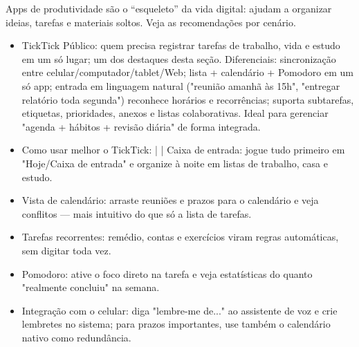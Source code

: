 


Apps de produtividade são o “esqueleto” da vida digital: ajudam a organizar ideias, tarefas e materiais soltos. Veja as recomendações por cenário.


\begin{itemize}
  \item TickTick Público: quem precisa registrar tarefas de trabalho, vida e estudo em um só lugar; um dos destaques desta seção. Diferenciais: sincronização entre celular/computador/tablet/Web; lista + calendário + Pomodoro em um só app; entrada em linguagem natural ("reunião amanhã às 15h", "entregar relatório toda segunda") reconhece horários e recorrências; suporta subtarefas, etiquetas, prioridades, anexos e listas colaborativas. Ideal para gerenciar "agenda + hábitos + revisão diária" de forma integrada.
  \item Como usar melhor o TickTick: | | Caixa de entrada: jogue tudo primeiro em "Hoje/Caixa de entrada" e organize à noite em listas de trabalho, casa e estudo.
  \item Vista de calendário: arraste reuniões e prazos para o calendário e veja conflitos — mais intuitivo do que só a lista de tarefas.
  \item Tarefas recorrentes: remédio, contas e exercícios viram regras automáticas, sem digitar toda vez.
  \item Pomodoro: ative o foco direto na tarefa e veja estatísticas do quanto "realmente concluiu" na semana.
  \item Integração com o celular: diga "lembre-me de..." ao assistente de voz e crie lembretes no sistema; para prazos importantes, use também o calendário nativo como redundância.
\end{itemize}

